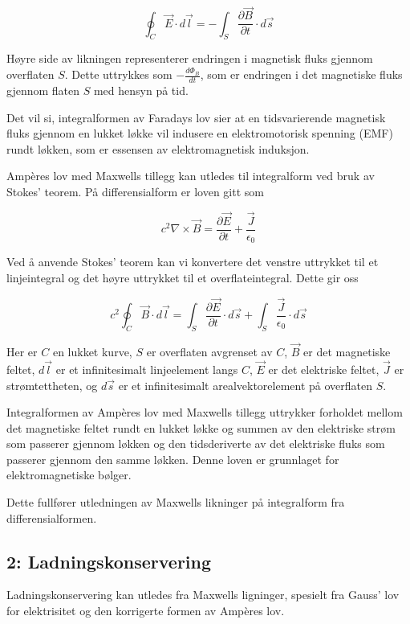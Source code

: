 \begin{equation*}
\oint_C \vec{E} \cdot d\vec{l} = -\int_S \frac{\partial \vec{B}}{\partial t} \cdot d\vec{s}
\end{equation*}

Høyre side av likningen representerer endringen i magnetisk fluks gjennom overflaten $S$. Dette uttrykkes som $-\frac{d\Phi_B}{dt}$, som er endringen i det magnetiske fluks gjennom flaten $S$ med hensyn på tid.

Det vil si, integralformen av Faradays lov sier at en tidsvarierende magnetisk fluks gjennom en lukket løkke vil indusere en elektromotorisk spenning (EMF) rundt løkken, som er essensen av elektromagnetisk induksjon.

Ampères lov med Maxwells tillegg kan utledes til integralform ved bruk av Stokes' teorem. På differensialform er loven gitt som

\begin{equation*}
c^2\nabla \times \vec{B} =\frac{\partial \vec{E}}{\partial t} + \frac{\vec{J}}{\epsilon_0}
\end{equation*}

Ved å anvende Stokes' teorem kan vi konvertere det venstre uttrykket til et linjeintegral og det høyre uttrykket til et overflateintegral. Dette gir oss

\begin{equation*}
c^2 \oint_C \vec{B} \cdot d\vec{l} = \int_S \frac{\partial \vec{E}}{\partial t} \cdot d\vec{s} + \int_S \frac{\vec{J}}{\epsilon_0} \cdot d\vec{s}
\end{equation*}

Her er $C$ en lukket kurve, $S$ er overflaten avgrenset av $C$, $\vec{B}$ er det magnetiske feltet, $d\vec{l}$ er et infinitesimalt linjeelement langs $C$, $\vec{E}$ er det elektriske feltet, $\vec{J}$ er strømtettheten, og $d\vec{s}$ er et infinitesimalt arealvektorelement på overflaten $S$.

Integralformen av Ampères lov med Maxwells tillegg uttrykker forholdet mellom det magnetiske feltet rundt en lukket løkke og summen av den elektriske strøm som passerer gjennom løkken og den tidsderiverte av det elektriske fluks som passerer gjennom den samme løkken. Denne loven er grunnlaget for elektromagnetiske bølger.

Dette fullfører utledningen av Maxwells likninger på integralform fra differensialformen.

\subsection*{2: Ladningskonservering}
Ladningskonservering kan utledes fra Maxwells ligninger, spesielt fra Gauss' lov for elektrisitet og den korrigerte formen av Ampères lov.


